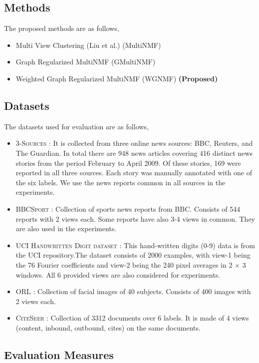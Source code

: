 \documentclass[a4paper]{article}
\begin{document}
	\subsection{Methods}
	
	The proposed methods are as follows,
	\begin{itemize}
	\item {Multi View Clustering (Liu et al.) (MultiNMF)}
	\item {Graph Regularized MultiNMF (GMultiNMF)}
	\item {Weighted Graph Regularized MultiNMF (WGNMF)	\small\textbf{(Proposed)}}
	\end{itemize}

	\subsection{Datasets}
	
	The datasets used for evaluation are as follows,
	\begin{itemize}
	\item \textsc{3-Sources} : It is collected from three online news sources: BBC, Reuters, and The Guardian. In total there are 948 news articles covering 416 distinct news stories from the period February to April 2009. Of these stories, 169 were reported in all three sources. Each story was manually annotated with one of the six labels. We use the news reports common in all sources in the experiments.
	\item \textsc{BBCSport} : Collection of sports news reports from BBC. Consists of 544 reports with 2 views each. Some reports have also 3-4 views in common. They are also used in the experiments.
	\item \textsc{UCI Handwritten Digit dataset} : This hand-written digits (0-9) data is from the UCI repository.The dataset consists of 2000 examples, with view-1 being the 76 Fourier coefficients and view-2 being the 240 pixel averages in 2 × 3 windows. All 6 provided views are also considered for experiments.
	\item \textsc{ORL} : Collection of facial images of 40 subjects. Consists of 400 images with 2 views each.
	\item \textsc{CiteSeer} : Collection of 3312 documents over 6 labels. It is made of 4 views (content, inbound, outbound, cites) on the same documents.
	\end{itemize}

	\subsection{Evaluation Measures}
\end{document}
